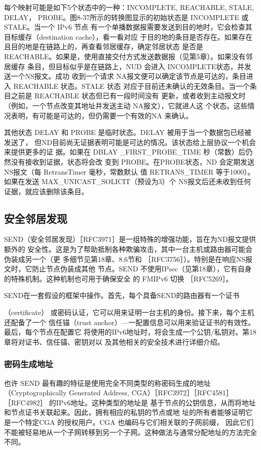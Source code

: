 每个映射可能是如下5个状态中的一种：INCOMPLETE, REACHABLE, STALE, DELAY，
PROBE。图8-37所示的转换图显示的初始状态是 INCOMPLETE 或 STALE。当一个 IPv6 节点
有一个单播数据报需要发送到目的地时，它会检查其目标缓存（destination cache），看一看对应
于目的地的条目是否存在。如果存在且目的地是在链路上的，再查看邻居缓存，确定邻居状态
是否是 REACHABLE。如果是，使用直接交付方式发送数据报（见第5章）。如果没有邻居缓存
条目，但目标似乎是在链路上，NUD 会进入 INCOMPLETE状态，并发送一个NS报文。成功
收到一个请求 NA报文便可以确定该节点是可达的，条目进入 REACHABLE 状态。STALE 状态
对应于目前还未确认的无效条目。当一个条目之前是 REACHABLE 状态但已有一段时间没有
更新，或者收到主动报文时（例如，一个节点改变其地址并发送主动 NA报文），它就进人这
个状态。这些情况表明，有可能是可达的，但仍需要一个有效的NA 来确认。

其他状态 DELAY 和 PROBE 是临时状态。DELAY 被用于当一个数据包已经被发送了，
但ND目前尚无证据表明可能是可达的情况。该状态给上层协议一个机会来提供更多的证
据。如果在 DBLAY \_FIRST\_PROBE\_TIME 秒（常数）后仍然没有接收到证据，状态将会改
变到 PROBE。在PROBE状态，ND 会定期发送NS报文（每 RetransTimer 毫秒，常数默认
值 RETRANS\_TIMER 等于1000）。如果在发送 MAX\_UNICAST\_SOLICIT（预设为3）个
NS报文后还未收到任何证据，就应该删除该条目。

\subsection{安全邻居发现}
SEND（安全邻居发现）［RFC3971］是一组特殊的增强功能，旨在为ND报文提供额外的
安全性。这是为了帮助抵制各种欺骗攻击，其中一台主机或路由器可能会伪装成另一个（更
多细节见第18章、8.6节和 ［RFC3756］）。特别是在响应NS报文时，它防止节点伪装成其他
节点。SEND 不使用IPsec（见第18章），它有自身的特殊机制。这种机制也可用于确保安全
的 FMIPv6 切换 ［RFC5269］。

SEND在一套假设的框架中操作。首先，每个具备SEND的路由器有一个证书

（certificate） 或密码认证，它可以用来证明一台主机的身份。接下来，每个主机还配备了一个
信任锚（trust anchor）—一配置信息可以用来验证证书的有效性。最后，每个节点在配置它
将使用的IPv6地址时，将会生成一个公钥/私钥对。第18章将对证书、信任锚、密钥对以
及其他相关的安全技术进行详细介绍。

\subsubsection{密码生成地址}
也许 SEND 最有趣的特征是使用完全不同类型的称密码生成的地址（Cryptographically
Generated Address, CGA）［RFC3972］［RFC4581］［RFC4982］ 的IPv6地址。这种类型的地址是
基于节点的公钥信息，从而将地址和节点证书关联起来。因此，拥有相应的私钥的节点或地
址的所有者能够证明它是一个特定CGA 的授权用户。CGA 也编码与它们相关联的子网前缀，
因此它们不能被轻易地从一个子网转移到另一个子网。这种做法与通常分配地址的方法完全
不同。

